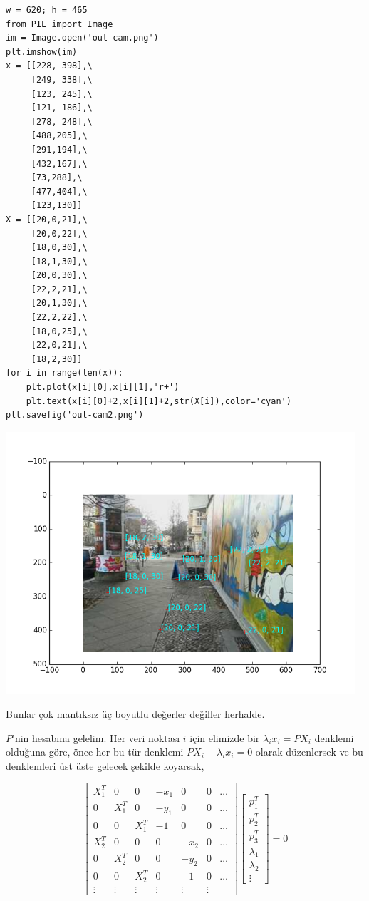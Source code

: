 \documentclass[12pt,fleqn]{article}\usepackage{../../common}
\begin{document}
\begin{verbatim}
w = 620; h = 465
from PIL import Image
im = Image.open('out-cam.png')
plt.imshow(im)
x = [[228, 398],\
     [249, 338],\
     [123, 245],\
     [121, 186],\
     [278, 248],\
     [488,205],\
     [291,194],\
     [432,167],\
     [73,288],\
     [477,404],\
     [123,130]]
X = [[20,0,21],\
     [20,0,22],\
     [18,0,30],\
     [18,1,30],\
     [20,0,30],\
     [22,2,21],\
     [20,1,30],\
     [22,2,22],\
     [18,0,25],\
     [22,0,21],\
     [18,2,30]]
for i in range(len(x)): 
    plt.plot(x[i][0],x[i][1],'r+')
    plt.text(x[i][0]+2,x[i][1]+2,str(X[i]),color='cyan')
plt.savefig('out-cam2.png')
\end{verbatim}


\includegraphics[width=35em]{out-cam2.png}

Bunlar çok mantıksız üç boyutlu değerler değiller herhalde. 

$P$'nin hesabına gelelim. Her veri noktası $i$ için elimizde bir
$\lambda_i x_i = PX_i$ denklemi olduğuna göre, önce her bu tür denklemi
$PX_i-\lambda_ix_i=0$ olarak düzenlersek ve bu denklemleri üst üste gelecek
şekilde koyarsak,

$$ 
\left[\begin{array}{ccccccc}
X_1^T & 0 & 0 & -x_1 & 0 & 0 & \dots \\
0 & X_1^T & 0 & -y_1 & 0 & 0 & \dots \\
0 & 0 & X_1^T & -1 & 0 & 0 & \dots \\
X_2^T & 0 & 0 & 0 & -x_2 & 0 & \dots \\
0 & X_2^T & 0 & 0 & -y_2 & 0 & \dots \\
0 & 0 & X_2^T & 0 & -1 & 0 & \dots \\
\vdots & \vdots & \vdots & \vdots & \vdots & \vdots &  
\end{array}\right]
\left[\begin{array}{c}
p_1^T \\ p_2^T \\ p_3^T \\ \lambda_1 \\ \lambda_2 \\ \vdots
\end{array}\right] = 0
$$
\end{document}
